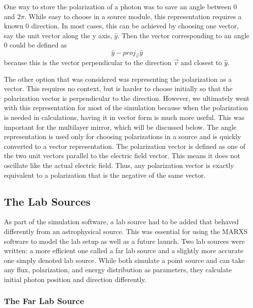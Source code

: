 \documentclass[manuscript]{aastex}
\begin{document}
One way to store the polarization of a photon was to save an angle between 0 and 2$\pi$. While easy to choose in a source module, this representation requires a known 0 direction. In most cases, this can be achieved by choosing one vector, say the unit vector along the y axis, $\hat{y}$. Then the vector corresponding to an angle 0 could be defined as
\begin{displaymath}
\hat{y}-proj_{\vec{v}}\hat{y}
\end{displaymath}
because this is the vector perpendicular to the direction $\vec{v}$ and closest to $\hat{y}$.

The other option that was considered was representing the polarization as a vector. This requires no context, but is harder to choose initially so that the polarization vector is perpendicular to the direction. However, we ultimately went with this representation for most of the simulation because when the polarization is needed in calculations, having it in vector form is much more useful. This was important for the multilayer mirror, which will be discussed below. The angle representation is used only for choosing polarizations in a source and is quickly converted to a vector representation. The polarization vector is defined as one of the two unit vectors parallel to the electric field vector. This means it does not oscillate like the actual electric field. Thus, any polarization vector is exactly equivalent to a polarization that is the negative of the same vector.

\subsection{The Lab Sources}

As part of the simulation software, a lab source had to be added that behaved differently from an astrophysical source. This was essential for using the MARXS software to model the lab setup as well as a future launch. Two lab sources were written: a more efficient one called a far lab source and a slightly more accurate one simply denoted lab source. While both simulate a point source and can take any flux, polarization, and energy distribution as parameters, they calculate initial photon position and direction differently.

\subsubsection{The Far Lab Source} \label{far lab source}
\end{document}
